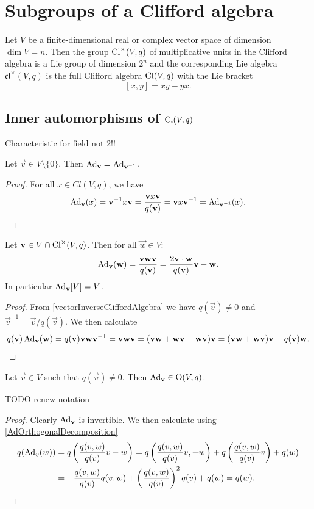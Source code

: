 \section{Subgroups of a Clifford algebra}

\begin{proposition}
Let $V$ be a finite-dimensional real or complex vector space of dimension $\dim V = n$. Then the group $\operatorname{Cl}^\times(V,q)$ of multiplicative units in the Clifford algebra is a Lie group of dimension $2^n$ and the corresponding Lie algebra $\mathfrak{cl}^\times(V,q)$ is the full Clifford algebra $\operatorname{Cl}(V,q)$ with the Lie bracket
\[ [x,y] = xy - yx.  \]
\end{proposition}

\subsection{Inner automorphisms of $\operatorname{Cl}(V,q)$}
Characteristic for field not 2!!

\begin{lemma}
Let $\vec{v}\in V\setminus\{0\}$. Then $\operatorname{Ad}_{\boldsymbol{\mathrm{v}}} = \operatorname{Ad}_{\boldsymbol{\mathrm{v}}^{-1}}$.
\end{lemma}
\begin{proof}
For all $x\in Cl(V,q)$, we have
\[ \operatorname{Ad}_{\boldsymbol{\mathrm{v}}}(x) = \boldsymbol{\mathrm{v}}^{-1}x\boldsymbol{\mathrm{v}} = \frac{\boldsymbol{\mathrm{v}}x\boldsymbol{\mathrm{v}}}{q(\boldsymbol{\mathrm{v}})} = \boldsymbol{\mathrm{v}}x\boldsymbol{\mathrm{v}}^{-1} = \operatorname{Ad}_{\boldsymbol{\mathrm{v}}^{-1}}(x). \]
\end{proof}

\begin{proposition} \label{AdOrthogonalDecomposition}
Let $\boldsymbol{\mathrm{v}}\in V\cap \operatorname{Cl}^\times(V,q)$. Then for all $\vec{w}\in V$:
\[ \operatorname{Ad}_{\boldsymbol{\mathrm{v}}}(\boldsymbol{\mathrm{w}}) = \frac{\boldsymbol{\mathrm{v}}\boldsymbol{\mathrm{w}}\boldsymbol{\mathrm{v}}}{q(\boldsymbol{\mathrm{v}})} = \frac{2\boldsymbol{\mathrm{v}}\cdot\boldsymbol{\mathrm{w}}}{q(\boldsymbol{\mathrm{v}})}\boldsymbol{\mathrm{v}} - \boldsymbol{\mathrm{w}}. \]
In particular $\operatorname{Ad}_{\boldsymbol{\mathrm{v}}}[V] = V$.
\end{proposition}
\begin{proof}
From \ref{vectorInverseCliffordAlgebra} we have $q(\vec{v})\neq 0$ and $\vec{v}^{-1} = \vec{v}/q(\vec{v})$.
We then calculate
\[ q(\boldsymbol{\mathrm{v}})\operatorname{Ad}_{\boldsymbol{\mathrm{v}}}(\boldsymbol{\mathrm{w}}) = q(\boldsymbol{\mathrm{v}})\boldsymbol{\mathrm{v}}\boldsymbol{\mathrm{w}}\boldsymbol{\mathrm{v}}^{-1} = \boldsymbol{\mathrm{v}}\boldsymbol{\mathrm{w}}\boldsymbol{\mathrm{v}} = (\boldsymbol{\mathrm{v}}\boldsymbol{\mathrm{w}} + \boldsymbol{\mathrm{w}}\boldsymbol{\mathrm{v}} - \boldsymbol{\mathrm{w}}\boldsymbol{\mathrm{v}})\boldsymbol{\mathrm{v}} = (\boldsymbol{\mathrm{v}}\boldsymbol{\mathrm{w}}+\boldsymbol{\mathrm{w}}\boldsymbol{\mathrm{v}})\boldsymbol{\mathrm{v}} - q(\boldsymbol{\mathrm{v}})\boldsymbol{\mathrm{w}}. \]
\end{proof}

\begin{lemma} \label{AdOrthogonalMap}
Let $\vec{v}\in V$ such that $q(\vec{v})\neq 0$. Then $\operatorname{Ad}_{\boldsymbol{\mathrm{v}}}\in \operatorname{O}(V,q)$.
\end{lemma}
TODO renew notation
\begin{proof}
Clearly $\operatorname{Ad}_{\boldsymbol{\mathrm{v}}}$ is invertible. We then calculate using \ref{AdOrthogonalDecomposition}
\begin{align*}
q(\operatorname{Ad}_v(w)) &= q\left(\frac{q(v,w)}{q(v)}v - w\right) = q\left(\frac{q(v,w)}{q(v)}v,-w\right) + q\left(\frac{q(v,w)}{q(v)}v\right) + q(w) \\
&= -\frac{q(v,w)}{q(v)}q(v,w)+\left(\frac{q(v,w)}{q(v)}\right)^2q(v) + q(w) = q(w).
\end{align*}
\end{proof}



